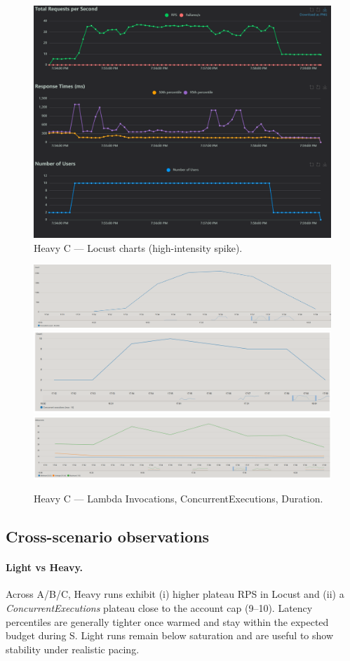 \documentclass[11pt,a4paper]{article}
\begin{document}
\begin{figure}[h!] \centering
  \includegraphics[width=\linewidth]{"figures/hC - Charts.png"}
  \caption{Heavy C --- Locust charts (high-intensity spike).}
\end{figure}

\begin{figure}[h!] \centering
  \includegraphics[width=.32\linewidth]{"figures/hC - Invocations.png"}\hfill
  \includegraphics[width=.32\linewidth]{"figures/hC - ConcEx.png"}\hfill
  \includegraphics[width=.32\linewidth]{"figures/hC - Duration.png"}
  \caption{Heavy C --- Lambda Invocations, ConcurrentExecutions, Duration.}
\end{figure}

\subsection{Cross-scenario observations}

\paragraph{Light vs Heavy.}
Across A/B/C, Heavy runs exhibit (i) higher plateau RPS in Locust and (ii) a \emph{ConcurrentExecutions} plateau close to the account cap (9--10). Latency percentiles are generally tighter once warmed and stay within the expected budget during S. Light runs remain below saturation and are useful to show stability under realistic pacing.
\end{document}
